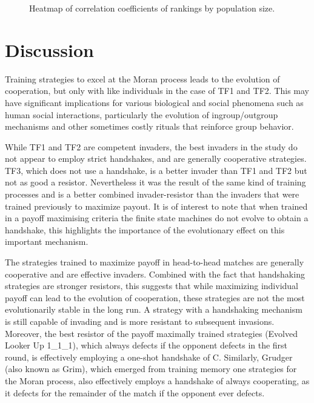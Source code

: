 \documentclass[10pt,letterpaper]{article}
\begin{document}
\begin{figure}[!htbp]
    \centering
    \caption{Heatmap of correlation coefficients of rankings by population size.}
    \label{fig:correlation_coefficients}
\end{figure}


\section*{Discussion}

Training strategies to excel
at the Moran process leads to the evolution of cooperation, but only with like
individuals in the case of TF1 and TF2. This may have significant implications
for various biological and social phenomena such as
human social interactions, particularly the evolution of ingroup/outgroup mechanisms
and other sometimes costly rituals that reinforce group behavior.

While TF1 and TF2 are competent invaders, the best invaders
in the study do not appear to employ strict handshakes, and are generally
cooperative strategies. TF3, which does not use a handshake, is a better invader
than TF1 and TF2 but not as good a resistor. Nevertheless it was the result
of the same kind of training processes and is a better combined invader-resistor
than the invaders that were trained previously to maximize payout. It is of
interest to note that when trained in a payoff maximising criteria the finite
state machines do not evolve to obtain a handshake, this highlights the
importance of the evolutionary effect on this important mechanism.

The strategies trained to maximize payoff in head-to-head matches are generally
cooperative and are effective invaders.
Combined with the fact that handshaking strategies are stronger resistors,
this suggests that while maximizing individual payoff can lead to the evolution
of cooperation, these strategies are not the most evolutionarily stable
in the long run. A strategy with a handshaking mechanism is still capable of
invading and is more resistant to subsequent invasions. Moreover, the
best resistor of the payoff maximally trained strategies (Evolved Looker Up
1\_1\_1),
which always defects if the opponent defects in the first round, is effectively
employing a one-shot handshake of C. Similarly, Grudger (also known as Grim),
which emerged from training memory one strategies for the Moran process,
also effectively employs a handshake of always cooperating, as it defects
for the remainder of the match if the opponent ever defects.
\end{document}
